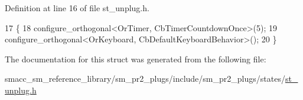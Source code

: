 Definition at line 16 of file st\+\_\+unplug.\+h.


\begin{DoxyCode}
17     \{
18         configure\_orthogonal<OrTimer,  CbTimerCountdownOnce>(5);    
19         configure\_orthogonal<OrKeyboard, CbDefaultKeyboardBehavior>();
20     \}
\end{DoxyCode}


The documentation for this struct was generated from the following file\+:\begin{DoxyCompactItemize}
\item 
smacc\+\_\+sm\+\_\+reference\+\_\+library/sm\+\_\+pr2\+\_\+plugs/include/sm\+\_\+pr2\+\_\+plugs/states/\hyperlink{st__unplug_8h}{st\+\_\+unplug.\+h}\end{DoxyCompactItemize}
